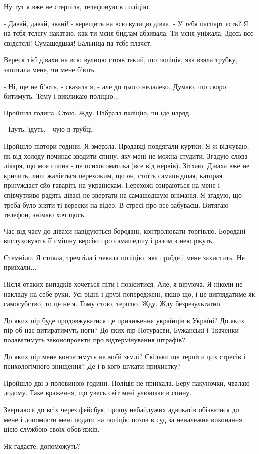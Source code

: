 Ну тут я вже не стерпіла, телефоную в поліцію.

- Давай, давай, звані! - верещить на всю вулицю дівка. - У тєбя паспарт єсть? Я
на тєбя тєлєгу накатаю, как ти мєня бидлам абзивала. Ти мєня уніжала. Здєсь всє
свідєтєлі! Сумашедшая! Бальніца па тєбє плачєт.

Вереск тієї дівахи на всю вулицю стояв такий, що поліція, яка взяла трубку,
запитала мене, чи мене б'ють.

 - Ні, ще не б'ють, - сказала я, - але до цього недалеко. Думаю, що скоро
 битимуть. Тому і викликаю поліцію... 

Пройшла година. Стою. Жду. Набрала поліцію, чи їде наряд.

- Їдуть, їдуть, - чую в трубці. 

Пройшло півтори години. Я змерзла. Продавці повдягали куртки. Я ж відчуваю, як
від холоду починає зводити спину, яку мені не можна студити. Згадую слова
лікаря, що моя спина - це психосоматика (все від нервів). Зітхаю. Діваха вже не
кричить, лиш жаліється перехожим, що он, стоїть самашєдшая, каторая прінуждаєт
єйо гаваріть на українскам. Перехожі озираються на мене і співчутливо радять
дівасі не звертати на самашедшую вніманія. Я згадую, що треба було зняти ті
верески на відео. В стресі про все забуваєш. Витягаю телефон, знімаю хоч щось.

Час від часу до дівахи навідуються бородані, контролювати торгівлю. Бородані
вислуховують її смішну версію про самашедшу і разом з нею ржуть. 

Стемніло. Я стояла, тремтіла і чекала поліцію, яка приїде і мене захистить. Не
приїхали...

Після отаких випадків хочеться піти і повіситися. Але, я віруюча. Я ніколи не
накладу на себе руки. Усі рідні і друзі попереджені, якщо що, і це виглядатиме
як самогубство, то це не я. Тому стою, терплю. Жду. Жду безрезультатно.  

До яких пір буде продовжуватися це приниження українців в Україні? До яких пір
об нас витиратимуть ноги? До яких пір Потураєви, Бужанські і Ткаченки
подаватимуть законопроекти про відтермінування штрафів? 

До яких пір мене кончатимуть на моїй землі? Скільки ще терпіти цих стресів і
психологічного знищення? Де і в кого шукати прихистку?

Пройшло дві з половиною години. Поліція не приїхала. Беру пакуночки, чвалаю
додому. Таке враження, що увесь світ мені улююкає в спину.

Звертаюся до всіх через фейсбук, прошу небайдужих адвокатів обізватися до мене
і допомогти мені подати на поліцію позов в суд за неналежне виконання цією
службою своїх обов'язків. 

Як гадаєте, допоможуть?
